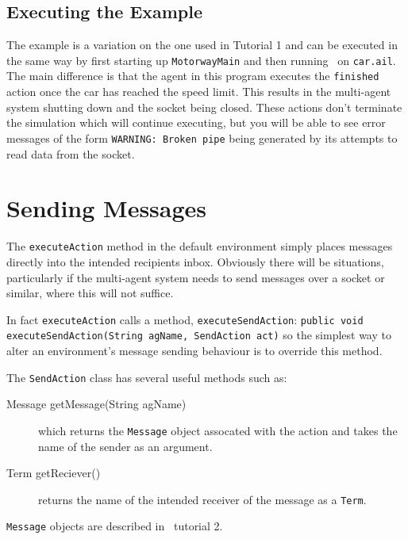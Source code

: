 \subsection{Executing the Example}
The example is a variation on the one used in Tutorial 1 and can be executed in the same way by first starting up \texttt{MotorwayMain} and then running \ail\ on \texttt{car.ail}.  The main difference is that the agent in this program executes the \lstinline{finished} action once the car has reached the speed limit.  This results in the multi-agent system shutting down and the socket being closed.  These actions don't terminate the simulation which will continue executing, but you will be able to see error messages of the form \texttt{WARNING: Broken pipe} being generated by its attempts to read data from the socket.

\section{Sending Messages}
The \texttt{executeAction} method in the default environment simply places messages directly into the intended recipients inbox.  Obviously there will be situations, particularly if the multi-agent system needs to send messages over a socket or similar, where this will not suffice.

In fact \texttt{executeAction} calls a method, \texttt{executeSendAction}: \texttt{public void executeSendAction(String agName, SendAction act)} so the simplest way to alter an environment's message sending behaviour is to override this method.

The \texttt{SendAction} class has several useful methods such as:
\begin{description}
\item[Message getMessage(String agName)] which returns the \texttt{Message} object assocated with the action and takes the name of the sender as an argument.
\item[Term getReciever()] returns the name of the intended receiver of the message as a \texttt{Term}.
\end{description}
\texttt{Message} objects are described in \ail\ tutorial 2.

